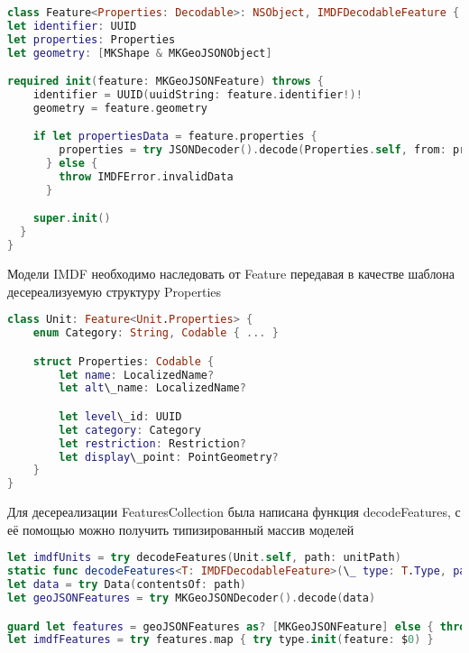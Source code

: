     \begin{lstlisting}[language=swift,caption={Реализация класса Feature}]
class Feature<Properties: Decodable>: NSObject, IMDFDecodableFeature {
let identifier: UUID
let properties: Properties
let geometry: [MKShape & MKGeoJSONObject]

required init(feature: MKGeoJSONFeature) throws {
    identifier = UUID(uuidString: feature.identifier!)!
    geometry = feature.geometry

    if let propertiesData = feature.properties {
        properties = try JSONDecoder().decode(Properties.self, from: propertiesData)
      } else {
        throw IMDFError.invalidData
      }

    super.init()
  }
}
  \end{lstlisting}

    Модели IMDF необходимо наследовать от Feature передавая в качестве шаблона десереализуемую структуру Properties

    \begin{lstlisting}[language=swift,caption={Пример объявления модели Unit}]
class Unit: Feature<Unit.Properties> {
    enum Category: String, Codable { ... }

    struct Properties: Codable {
        let name: LocalizedName?
        let alt\_name: LocalizedName?

        let level\_id: UUID
        let category: Category
        let restriction: Restriction?
        let display\_point: PointGeometry?
    }
}
    \end{lstlisting}

    Для десереализации FeaturesCollection была написана функция decodeFeatures, с её помощью можно получить типизированный массив моделей

    \begin{lstlisting}[language=swift,caption={Пример десереализации массива комнат Units}]
let imdfUnits = try decodeFeatures(Unit.self, path: unitPath)
static func decodeFeatures<T: IMDFDecodableFeature>(\_ type: T.Type, path: URL) throws -> [T] {
let data = try Data(contentsOf: path)
let geoJSONFeatures = try MKGeoJSONDecoder().decode(data)

guard let features = geoJSONFeatures as? [MKGeoJSONFeature] else { throw IMDFError.invalidType }
let imdfFeatures = try features.map { try type.init(feature: $0) }
  \end{lstlisting}

